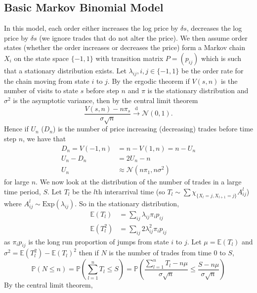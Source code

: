 \documentclass[a4paper,10pt]{article}
\begin{document}
\subsection{Basic Markov Binomial Model}
In this model, each order either increases the log price by $\delta s$, decreases the log price by $\delta s$ (we ignore trades that do not alter the price). We then assume order states (whether the order increases or decreases the price) form a Markov chain $X_i$ on the state space $\{-1, 1\}$ with transition matrix $P = (p_{ij})$ which is such that a stationary distribution exists. Let $\lambda_{ij}, i,j \in \{-1, 1\}$ be the order rate for the chain moving from state $i$ to $j$. By the ergodic theorem if $V(s, n)$ is the number of visits to state $s$ before step $n$ and $\pi$ is the stationary distribution and $\sigma^2$ is the asymptotic variance, then by the central limit theorem
\begin{equation}
\frac{V(s, n) - n\pi_s}{\sigma \sqrt{n}} \xrightarrow{\text{d}} \mathcal{N}(0, 1). %
\end{equation}
Hence if $U_n$ ($D_n$) is the number of price increasing (decreasing) trades before time step $n$, we have that
\begin{align}
D_n = V(-1, n) &= n - V(1, n) = n - U_n \\
U_n - D_n &= 2U_n - n \\
U_n &\approx  \mathcal{N}(n\pi_1, n\sigma^2)
\end{align}
for large $n$. 
We now look at the distribution of the number of trades in a large time period, $S$. Let $T_l$ be the $l$th interarrival time (so $T_l \sim \sum \chi_{\{X_l = j, X_{l + 1} = j\}} A_{ij}^l $) where $A_{ij}^l \sim \text{Exp}(\lambda_{ij})$. So in the stationary distribution,
\begin{align}
\mathbb{E}(T_l) &= \sum_{ij} \lambda_{ij}\pi_{i}p_{ij}\\
\mathbb{E}(T_l^2) &=  \sum_{ij} 2\lambda_{ij}^2\pi_{i}p_{ij}
\end{align}
as $\pi_i p_{ij}$ is the long run proportion of jumps from state $i$ to $j$. Let $\mu = \mathbb{E}(T_l)$ and $\sigma^2 = \mathbb{E}(T_l^2) - \mathbb{E}(T_l)^2$ then if $N$ is the number of trades from time $0$ to $S$,
\begin{equation}
\mathbb{P}(N \leq n) = \mathbb{P}\left(\sum_{l=1}^n T_l \leq S\right) = \mathbb{P}\left(\frac{\sum_{l=1}^n T_l - n\mu}{\sigma \sqrt{n}} \leq \frac{S - n\mu}{\sigma \sqrt{n}} \right) 
\end{equation}
By the central limit theorem, 
\end{document}
